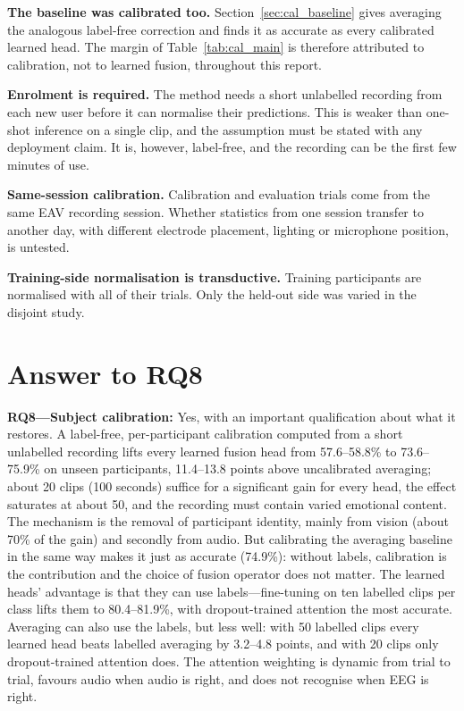 \textbf{The baseline was calibrated too.} Section~\ref{sec:cal_baseline} gives
averaging the analogous label-free correction and finds it as accurate as every
calibrated learned head. The margin of Table~\ref{tab:cal_main} is therefore attributed
to calibration, not to learned fusion, throughout this report.

\textbf{Enrolment is required.} The method needs a short unlabelled recording from
each new user before it can normalise their predictions. This is weaker than one-shot
inference on a single clip, and the assumption must be stated with any deployment
claim. It is, however, label-free, and the recording can be the first few minutes of
use.

\textbf{Same-session calibration.} Calibration and evaluation trials come from the same
EAV recording session. Whether statistics from one session transfer to another day,
with different electrode placement, lighting or microphone position, is untested.

\textbf{Training-side normalisation is transductive.} Training participants are
normalised with all of their trials. Only the held-out side was varied in the
disjoint study.

\section{Answer to RQ8}
\label{sec:cal_rq}

\textbf{RQ8---Subject calibration:} Yes, with an important qualification about what it
restores. A label-free, per-participant calibration computed from a short unlabelled
recording lifts every learned fusion head from 57.6--58.8\% to 73.6--75.9\% on unseen
participants, 11.4--13.8 points above uncalibrated averaging; about 20 clips (100
seconds) suffice for a significant gain for every head, the effect saturates at about
50, and the recording must contain varied emotional content. The mechanism is the
removal of participant identity, mainly from vision (about 70\% of the gain) and
secondly from audio. But calibrating the averaging baseline in the same way makes it
just as accurate (74.9\%): without labels, calibration is the contribution and the
choice of fusion operator does not matter. The learned heads' advantage is that they
can use labels---fine-tuning on ten labelled clips per class lifts them to
80.4--81.9\%, with dropout-trained attention the most accurate. Averaging can also use
the labels, but less well: with 50 labelled clips every learned head beats labelled
averaging by 3.2--4.8 points, and with 20 clips only dropout-trained attention does.
The attention weighting is
dynamic from trial to trial, favours audio when audio is right, and does not recognise
when EEG is right.
